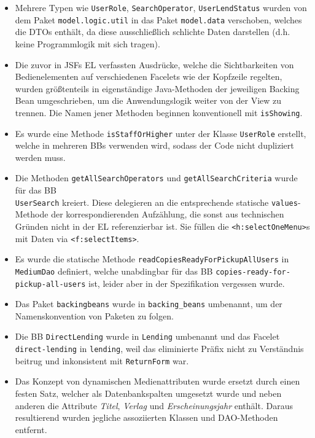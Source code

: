 \documentclass{article}
\begin{document}
\begin{itemize}
    \item Mehrere Typen wie \texttt{UserRole}, \texttt{SearchOperator}, \texttt{UserLendStatus} wurden von dem Paket \texttt{model.logic.util} in das Paket \texttt{model.data} verschoben, welches die DTOs enthält, da diese ausschließlich schlichte Daten darstellen (d.h. keine Programmlogik mit sich tragen).
    \item Die zuvor in JSFs EL verfassten Ausdrücke, welche die Sichtbarkeiten von Bedienelementen auf verschiedenen Facelets wie der Kopfzeile regelten, wurden größtenteils in eigenständige Java-Methoden der jeweiligen Backing Bean umgeschrieben, um die Anwendungslogik weiter von der View zu trennen. Die Namen jener Methoden beginnen konventionell mit \texttt{isShowing}.
    \item Es wurde eine Methode \texttt{isStaffOrHigher} unter der Klasse \texttt{UserRole} erstellt, welche in mehreren BBs verwenden wird, sodass der Code nicht dupliziert werden muss.
    \item Die Methoden \texttt{getAllSearchOperators} und \texttt{getAllSearchCriteria} wurde für das BB\\ \texttt{UserSearch} kreiert. Diese delegieren an die entsprechende statische \texttt{values}-Methode der korrespondierenden Aufzählung, die sonst aus technischen Gründen nicht in der EL referenzierbar ist. Sie füllen die \texttt{<h:selectOneMenu>}s mit Daten via \texttt{<f:selectItems>}.
    \item Es wurde die statische Methode \texttt{readCopiesReadyForPickupAllUsers} in \texttt{MediumDao} definiert, welche unabdingbar für das BB \texttt{copies-ready-for-pickup-all-users} ist, leider aber in der Spezifikation vergessen wurde.
    \item Das Paket \texttt{backingbeans} wurde in \texttt{backing\_beans} umbenannt, um der Namenskonvention von Paketen zu folgen.
    \item Die BB \texttt{DirectLending} wurde in \texttt{Lending} umbenannt und das Facelet \texttt{direct-lending} in \texttt{lending}, weil das eliminierte Präfix nicht zu Verständnis beitrug und inkonsistent mit \texttt{ReturnForm} war.
    \item Das Konzept von dynamischen Medienattributen wurde ersetzt durch einen festen Satz, welcher als Datenbankspalten umgesetzt wurde und neben anderen die Attribute \textit{Titel}, \textit{Verlag} und \textit{Erscheinungsjahr} enthält. Daraus resultierend wurden jegliche assoziierten Klassen und DAO-Methoden entfernt.

\end{itemize}
\end{document}
